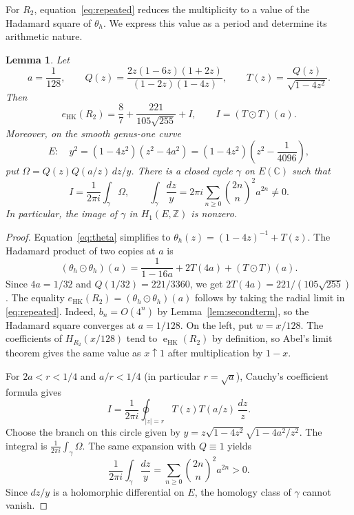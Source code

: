 \documentclass[11pt,a4paper,reqno]{amsart}
\numberwithin{equation}{section}
\theoremstyle{plain}
\newtheorem{lemma}[theorem]{Lemma}
\newcommand{\eHK}{\operatorname{e}_{\mathrm{HK}}}
\begin{document}
For $R_2$, equation~\eqref{eq:repeated} reduces the multiplicity to a value of the Hadamard square of $\theta_h$. We express this value as a period and determine its arithmetic nature.
\begin{lemma}\label{lem:period}
Let
\[
 a=\frac1{128},\qquad
 Q(z)=\frac{2z(1-6z)(1+2z)}{(1-2z)(1-4z)},\qquad
 T(z)=\frac{Q(z)}{\sqrt{1-4z^2}}.
\]
Then
\begin{equation}\label{eq:split}
 e_{\mathrm{HK}}(R_2)=\frac87+\frac{221}{105\sqrt{255}}+I,
 \qquad I=(T\odot T)(a).
\end{equation}
Moreover, on the smooth genus-one curve
\begin{equation}\label{eq:curve}
 E:\quad y^2=(1-4z^2)(z^2-4a^2)
       =(1-4z^2)\left(z^2-\frac1{4096}\right),
\end{equation}
put $\Omega=Q(z)Q(a/z)\,dz/y$. There is a closed cycle $\gamma$ on
$E(\mathbb C)$ such that
\begin{equation}\label{eq:period}
 I=\frac{1}{2\pi i}\int_\gamma\Omega,
 \qquad \int_\gamma\frac{dz}{y}
  =2\pi i\sum_{n\geq0}\binom{2n}{n}^{\!2}a^{2n}\neq0.
\end{equation}
In particular, the image of $\gamma$ in $H_1(E,\mathbb Z)$ is nonzero.
\end{lemma}
\begin{proof}
Equation~\eqref{eq:theta} simplifies to
$\theta_h(z)=(1-4z)^{-1}+T(z)$. The Hadamard product of two copies at $a$ is
\[
 (\theta_h\odot\theta_h)(a)=\frac1{1-16a}+2T(4a)+(T\odot T)(a).
\]
Since $4a=1/32$ and $Q(1/32)=221/3360$, we get
$2T(4a)=221/(105\sqrt{255})$. The equality
$e_{\mathrm{HK}}(R_2)=(\theta_h\odot\theta_h)(a)$ follows by taking the radial limit in \eqref{eq:repeated}. Indeed, $b_n=O(4^n)$ by Lemma~\ref{lem:secondterm}, so the Hadamard square converges at $a=1/128$. On the left, put $w=x/128$. The coefficients of $H_{R_2}(x/128)$ tend to $\eHK(R_2)$ by definition, so Abel's limit theorem gives the same value as $x\uparrow1$ after multiplication by $1-x$.

For $2a<r<1/4$ and $a/r<1/4$ (in particular $r=\sqrt a$), Cauchy's coefficient formula gives
\[
 I=\frac1{2\pi i}\oint_{|z|=r}T(z)T(a/z)\,\frac{dz}{z}.
\]
Choose the branch on this circle given by
$y=z\sqrt{1-4z^2}\sqrt{1-4a^2/z^2}$. The integral is
$\frac1{2\pi i}\int_\gamma\Omega$. The same expansion with $Q\equiv1$ yields
\[
 \frac1{2\pi i}\int_\gamma\frac{dz}{y}
 =\sum_{n\geq0}\binom{2n}{n}^2a^{2n}>0.
\]
Since $dz/y$ is a holomorphic differential on $E$, the homology class of $\gamma$ cannot vanish.
\end{proof}
\end{document}
